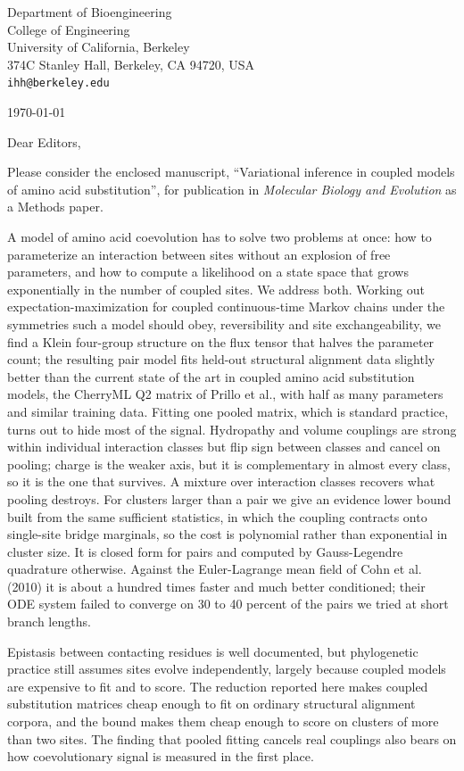 \documentclass[11pt]{article}
\begin{document}
{\small
Department of Bioengineering\\
College of Engineering\\
University of California, Berkeley\\
374C Stanley Hall, Berkeley, CA 94720, USA\\
\texttt{ihh@berkeley.edu}
}

\hfill\today

Dear Editors,

Please consider the enclosed manuscript, ``Variational inference in coupled
models of amino acid substitution'', for publication in \emph{Molecular Biology
and Evolution} as a Methods paper.

A model of amino acid coevolution has to solve two problems at once: how to
parameterize an interaction between sites without an explosion of free
parameters, and how to compute a likelihood on a state space that grows
exponentially in the number of coupled sites. We address both. Working out
expectation-maximization for coupled continuous-time Markov chains under the
symmetries such a model should obey, reversibility and site exchangeability, we
find a Klein four-group structure on the flux tensor that halves the parameter
count; the resulting pair model fits held-out structural alignment data
slightly better than the current state of the art in coupled amino acid
substitution models, the CherryML Q2 matrix of Prillo et al., with half as many
parameters and similar training data. Fitting one pooled matrix, which is standard practice,
turns out to hide most of the signal. Hydropathy and volume couplings are
strong within individual interaction classes but flip sign between classes and
cancel on pooling; charge is the weaker axis, but it is complementary in almost
every class, so it is the one that survives. A mixture over interaction classes
recovers what pooling destroys. For clusters larger than a pair we give an
evidence lower bound built from the same sufficient statistics, in which the
coupling contracts onto single-site bridge marginals, so the cost is polynomial
rather than exponential in cluster size. It is closed form for pairs and
computed by Gauss-Legendre quadrature otherwise. Against the Euler-Lagrange
mean field of Cohn et al. (2010) it is about a hundred times faster and much
better conditioned; their ODE system failed to converge on 30 to 40 percent of
the pairs we tried at short branch lengths.

Epistasis between contacting residues is well documented, but phylogenetic
practice still assumes sites evolve independently, largely because coupled
models are expensive to fit and to score. The reduction reported here makes
coupled substitution matrices cheap enough to fit on ordinary structural
alignment corpora, and the bound makes them cheap enough to score on clusters
of more than two sites. The finding that pooled fitting cancels real couplings
also bears on how coevolutionary signal is measured in the first place.
\end{document}
